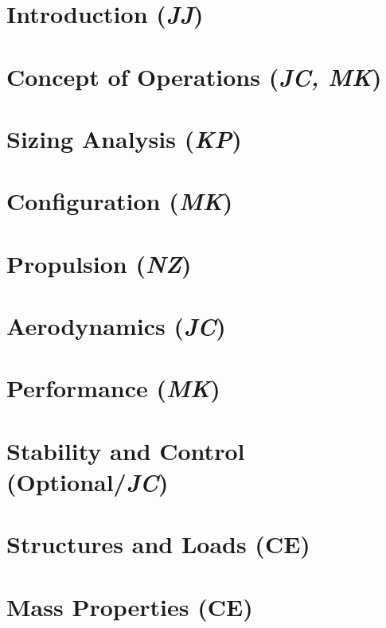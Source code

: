 \documentclass[conf]{new-aiaa}
\begin{document}

\section{Introduction (\textit{JJ})}


\section{Concept of Operations (\textit{JC, MK})}


\section{Sizing Analysis (\textit{KP})}


\section{Configuration (\textit{MK})}


\section{Propulsion (\textit{NZ})}


\newpage
\section{Aerodynamics (\textit{JC})}


\section{Performance (\textit{MK})}


\section{Stability and Control (Optional/\textit{JC})}


\section{Structures and Loads (CE)}


\section{Mass Properties (CE)}

\end{document}
